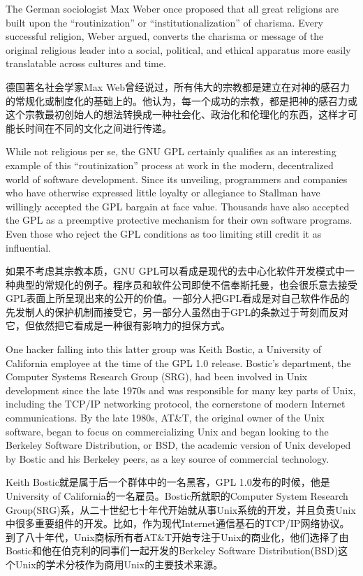 \ifdefined\eng
The German sociologist Max Weber once proposed that all great religions are built upon the ``routinization'' or ``institutionalization'' of charisma. Every successful religion, Weber argued, converts the charisma or message of the original religious leader into a social, political, and ethical apparatus more easily translatable across cultures and time.
\fi

\ifdefined\chs
德国著名社会学家Max Web曾经说过，所有伟大的宗教都是建立在对神的感召力的常规化或制度化的基础上的。他认为，每一个成功的宗教，都是把神的感召力或这个宗教最初创始人的想法转换成一种社会化、政治化和伦理化的东西，这样才可能长时间在不同的文化之间进行传递。
\fi

\ifdefined\eng
While not religious per se, the GNU GPL certainly qualifies as an interesting example of this ``routinization'' process at work in the modern, decentralized world of software development. Since its unveiling, programmers and companies who have otherwise expressed little loyalty or allegiance to Stallman have willingly accepted the GPL bargain at face value. Thousands have also accepted the GPL as a preemptive protective mechanism for their own software programs. Even those who reject the GPL conditions as too limiting still credit it as influential.
\fi

\ifdefined\chs
如果不考虑其宗教本质，GNU GPL可以看成是现代的去中心化软件开发模式中一种典型的常规化的例子。程序员和软件公司即使不信奉斯托曼，也会很乐意去接受GPL表面上所呈现出来的公开的价值。一部分人把GPL看成是对自己软件作品的先发制人的保护机制而接受它，另一部分人虽然由于GPL的条款过于苛刻而反对它，但依然把它看成是一种很有影响力的担保方式。
\fi

\ifdefined\eng
One hacker falling into this latter group was Keith Bostic, a University of California employee at the time of the GPL 1.0 release. Bostic's department, the Computer Systems Research Group (SRG), had been involved in Unix development since the late 1970s and was responsible for many key parts of Unix, including the TCP/IP networking protocol, the cornerstone of modern Internet communications. By the late 1980s, AT\&T, the original owner of the Unix software, began to focus on commercializing Unix and began looking to the Berkeley Software Distribution, or BSD, the academic version of Unix developed by Bostic and his Berkeley peers, as a key source of commercial technology.
\fi

\ifdefined\chs
Keith Bostic就是属于后一个群体中的一名黑客，GPL 1.0发布的时候，他是University of California的一名雇员。Bostic所就职的Computer System Research Group(SRG)系，从二十世纪七十年代开始就从事Unix系统的开发，并且负责Unix中很多重要组件的开发。比如，作为现代Internet通信基石的TCP/IP网络协议。到了八十年代，Unix商标所有者AT\&T开始专注于Unix的商业化，他们选择了由Bostic和他在伯克利的同事们一起开发的Berkeley Software Distribution(BSD)这个Unix的学术分枝作为商用Unix的主要技术来源。
\fi

